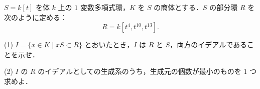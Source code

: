 \documentclass[12pt]{jlreq}
\begin{document}
\(S = k[t]\) を体 \(k\) 上の \(1\) 変数多項式環，\(K\) を \(S\) の商体とする．\(S\) の部分環 \(R\) を次のように定める：
\[
  R = k[t^4, t^{10}, t^{13}].
\]

(1) \(I = \{ x \in K \mid xS \subset R \}\) とおいたとき，\(I\) は \(R\) と \(S\)，両方のイデアルであることを示せ．

(2) \(I\) の \(R\) のイデアルとしての生成系のうち，生成元の個数が最小のものを \(1\) つ求めよ．
\end{document}
